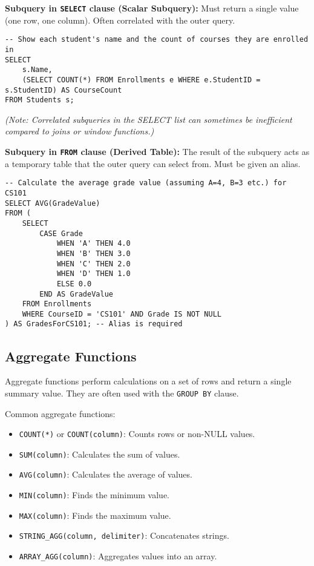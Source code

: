 \documentclass[12pt]{book}
\begin{document}
\textbf{Subquery in \texttt{SELECT} clause (Scalar Subquery):} Must return a single value (one row, one column). Often correlated with the outer query.

\begin{lstlisting}[caption={Subquery in SELECT Clause}, label=lst:subquery_select]
-- Show each student's name and the count of courses they are enrolled in
SELECT
    s.Name,
    (SELECT COUNT(*) FROM Enrollments e WHERE e.StudentID = s.StudentID) AS CourseCount
FROM Students s;
\end{lstlisting}
\textit{(Note: Correlated subqueries in the SELECT list can sometimes be inefficient compared to joins or window functions.)}

\textbf{Subquery in \texttt{FROM} clause (Derived Table):} The result of the subquery acts as a temporary table that the outer query can select from. Must be given an alias.

\begin{lstlisting}[caption={Subquery in FROM Clause}, label=lst:subquery_from]
-- Calculate the average grade value (assuming A=4, B=3 etc.) for CS101
SELECT AVG(GradeValue)
FROM (
    SELECT
        CASE Grade
            WHEN 'A' THEN 4.0
            WHEN 'B' THEN 3.0
            WHEN 'C' THEN 2.0
            WHEN 'D' THEN 1.0
            ELSE 0.0
        END AS GradeValue
    FROM Enrollments
    WHERE CourseID = 'CS101' AND Grade IS NOT NULL
) AS GradesForCS101; -- Alias is required
\end{lstlisting}

\subsection{Aggregate Functions}

Aggregate functions perform calculations on a set of rows and return a single summary value. They are often used with the \texttt{GROUP BY} clause.

Common aggregate functions:
\begin{itemize}
    \item \texttt{COUNT(*)} or \texttt{COUNT(column)}: Counts rows or non-NULL values.
    \item \texttt{SUM(column)}: Calculates the sum of values.
    \item \texttt{AVG(column)}: Calculates the average of values.
    \item \texttt{MIN(column)}: Finds the minimum value.
    \item \texttt{MAX(column)}: Finds the maximum value.
    \item \texttt{STRING\_AGG(column, delimiter)}: Concatenates strings.
    \item \texttt{ARRAY\_AGG(column)}: Aggregates values into an array.
\end{itemize}
\end{document}

